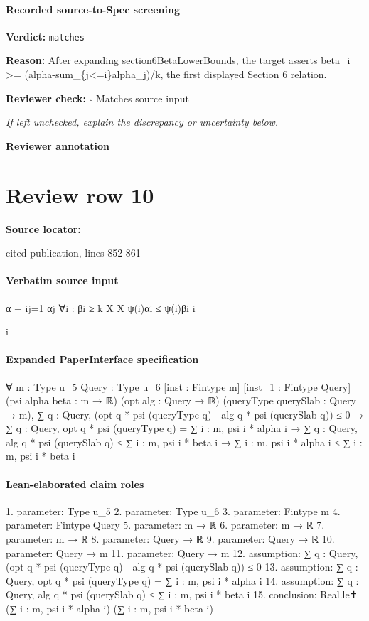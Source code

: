 \documentclass[10pt]{article}
\newcommand{\reviewerbox}{%
  \par\noindent\fbox{\parbox{0.96\linewidth}{\rule{0pt}{0.38in}}}\par
}
\newcommand{\reviewmatch}[1]{%
  \par\noindent\textbf{Reviewer check:} $\square$\; #1\par
  \noindent\emph{If left unchecked, explain the discrepancy or uncertainty below.}\par
}
\begin{document}
\paragraph{Recorded source-to-Spec screening}
\textbf{Verdict:} \texttt{matches}
\\
{\raggedright
\textbf{Reason:} After expanding section6BetaLowerBounds, the target asserts beta\_\allowbreak{}i >= (alpha-\allowbreak{}sum\_\allowbreak{}\{j<=i\}alpha\_\allowbreak{}j)/\allowbreak{}k, the first displayed Section 6 relation.\allowbreak{}
\par}
\reviewmatch{Matches source input}
\noindent\textbf{Reviewer annotation}\par
\reviewerbox
\clearpage
\hypertarget{source-claim-e7cd47f9b49b64a7}{}
\section*{Review row 10}
\textbf{Source locator:} {\footnotesize\raggedright cited publication, lines 852-\allowbreak{}861\par}
\paragraph{Verbatim source input}
\begin{ReviewVerbatim}
α − ij=1 αj
∀i : βi ≥
k
X
X
ψ(i)αi ≤
ψ(i)βi
i

i
\end{ReviewVerbatim}



\paragraph{Expanded PaperInterface specification}
\begin{ReviewVerbatim}
∀ {m : Type u_5} {Query : Type u_6} [inst : Fintype m] [inst_1 : Fintype Query] (psi alpha beta : m → ℝ)
  (opt alg : Query → ℝ) (queryType querySlab : Query → m),
  ∑ q : Query, (opt q * psi (queryType q) - alg q * psi (querySlab q)) ≤ 0 →
    ∑ q : Query, opt q * psi (queryType q) = ∑ i : m, psi i * alpha i →
      ∑ q : Query, alg q * psi (querySlab q) ≤ ∑ i : m, psi i * beta i →
        ∑ i : m, psi i * alpha i ≤ ∑ i : m, psi i * beta i
\end{ReviewVerbatim}


\paragraph{Lean-elaborated claim roles}\begin{ReviewVerbatim}
1. parameter: Type u_5
2. parameter: Type u_6
3. parameter: Fintype m
4. parameter: Fintype Query
5. parameter: m → ℝ
6. parameter: m → ℝ
7. parameter: m → ℝ
8. parameter: Query → ℝ
9. parameter: Query → ℝ
10. parameter: Query → m
11. parameter: Query → m
12. assumption: ∑ q : Query, (opt q * psi (queryType q) - alg q * psi (querySlab q)) ≤ 0
13. assumption: ∑ q : Query, opt q * psi (queryType q) = ∑ i : m, psi i * alpha i
14. assumption: ∑ q : Query, alg q * psi (querySlab q) ≤ ∑ i : m, psi i * beta i
15. conclusion: Real.le✝ (∑ i : m, psi i * alpha i) (∑ i : m, psi i * beta i)
\end{ReviewVerbatim}
\end{document}
